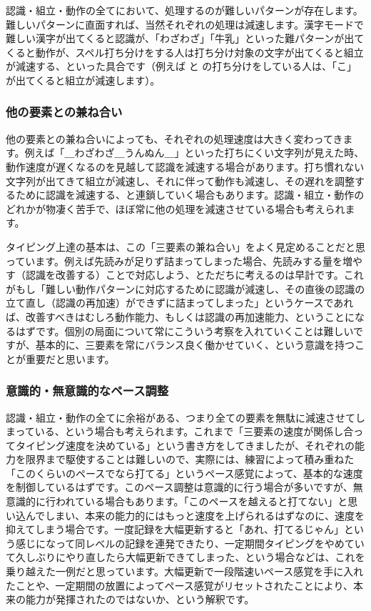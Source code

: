 認識・組立・動作の全てにおいて、処理するのが難しいパターンが存在します。難しいパターンに直面すれば、当然それぞれの処理は減速します。漢字モードで難しい漢字が出てくると認識が、「わざわざ」「牛乳」といった難パターンが出てくると動作が、スペル打ち分けをする人は打ち分け対象の文字が出てくると組立が減速する、といった具合です（例えば  と  の打ち分けをしている人は、「こ」が出てくると組立が減速します）。

\subsubsection*{他の要素との兼ね合い}

他の要素との兼ね合いによっても、それぞれの処理速度は大きく変わってきます。例えば「＿わざわざ＿うんぬん＿」といった打ちにくい文字列が見えた時、動作速度が遅くなるのを見越して認識を減速する場合があります。打ち慣れない文字列が出てきて組立が減速し、それに伴って動作も減速し、その遅れを調整するために認識を減速する、と連鎖していく場合もあります。認識・組立・動作のどれかが物凄く苦手で、ほぼ常に他の処理を減速させている場合も考えられます。

タイピング上達の基本は、この「三要素の兼ね合い」をよく見定めることだと思っています。例えば先読みが足りず詰まってしまった場合、先読みする量を増やす（認識を改善する）ことで対応しよう、とただちに考えるのは早計です。これがもし「難しい動作パターンに対応するために認識が減速し、その直後の認識の立て直し（認識の再加速）ができずに詰まってしまった」というケースであれば、改善すべきはむしろ動作能力、もしくは認識の再加速能力、ということになるはずです。個別の局面について常にこういう考察を入れていくことは難しいですが、基本的に、三要素を常にバランス良く働かせていく、という意識を持つことが重要だと思います。

\subsubsection*{意識的・無意識的なペース調整}

認識・組立・動作の全てに余裕がある、つまり全ての要素を無駄に減速させてしまっている、という場合も考えられます。これまで「三要素の速度が関係し合ってタイピング速度を決めている」という書き方をしてきましたが、それぞれの能力を限界まで駆使することは難しいので、実際には、練習によって積み重ねた「このくらいのペースでなら打てる」というペース感覚によって、基本的な速度を制御しているはずです。このペース調整は意識的に行う場合が多いですが、無意識的に行われている場合もあります。「このペースを越えると打てない」と思い込んでしまい、本来の能力的にはもっと速度を上げられるはずなのに、速度を抑えてしまう場合です。一度記録を大幅更新すると「あれ、打てるじゃん」という感じになって同レベルの記録を連発できたり、一定期間タイピングをやめていて久しぶりにやり直したら大幅更新できてしまった、という場合などは、これを乗り越えた一例だと思っています。大幅更新で一段階速いペース感覚を手に入れたことや、一定期間の放置によってペース感覚がリセットされたことにより、本来の能力が発揮されたのではないか、という解釈です。

